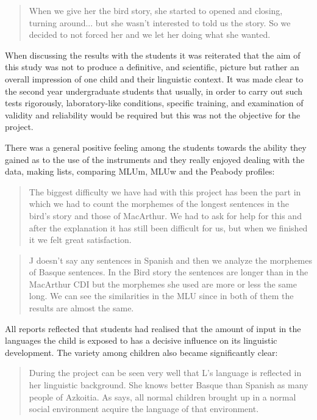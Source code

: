 \documentclass[output=paper]{../langscibook}
\begin{document}
\begin{quote}
When we give her the bird story, she started to opened and closing, turning around... but she wasn’t interested to told us the story. So we decided to not forced her and we let her doing what she wanted.
\end{quote}

When discussing the results with the students it was reiterated that the aim of this study was not to produce a definitive, and scientific, picture but rather an overall impression of one child and their linguistic context. It was made clear to the second year undergraduate students that usually, in order to carry out such tests rigorously, laboratory-like conditions, specific training, and examination of validity and reliability would be required but this was not the objective for the project.



There was a general positive feeling among the students towards the ability they gained as to the use of the instruments and they really enjoyed dealing with the data, making lists, comparing MLUm, MLUw and the Peabody profiles:

\begin{quote}
The biggest difficulty we have had with this project has been the part in which we had to count the morphemes of the longest sentences in the bird’s story and those of MacArthur. We had to ask for help for this and after the explanation it has still been difficult for us, but when we finished it we felt great satisfaction.
\end{quote}

\begin{quote}
J doesn’t say any sentences in Spanish and then we analyze the morphemes of Basque sentences. In the Bird story the sentences are longer than in the MacArthur CDI but the morphemes she used are more or less the same long. We can see the similarities in the MLU since in both of them the results are almost the same.
\end{quote}

All reports reflected that students had realised that the amount of input in the languages the child is exposed to has a decisive influence on its linguistic development. The variety among children also became significantly clear:

\begin{quote}
During the project can be seen very well that L’s language is reflected in her linguistic background. She knows better Basque than Spanish as many people of Azkoitia. As \citet{Palenham2004} says, all normal children brought up in a normal social environment acquire the language of that environment.
\end{quote}
\end{document}
